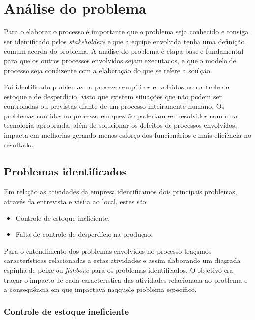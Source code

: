 \chapter{Análise do problema}

Para o elaborar o processo é importante que o problema seja conhecido e consiga ser identificado pelos {\itshape stakeholders} e que a equipe envolvida tenha uma definição comum acerda do problema. A análise do problema é etapa base e fundamental para que os outros processos envolvidos sejam executados, e que o modelo de processo seja condizente com a elaboração do que se refere a soulção.

Foi identificado problemas no processo empíricos envolvidos no controle do estoque e de desperdício, visto que existem situações que não podem ser controladas ou previstas diante de um processo inteiramente humano. Os problemas contidos no processo em questão poderiam ser resolvidos com uma tecnologia apropriada, além de solucionar os defeitos de processos envolvidos, impacta em melhorias gerando menos esforço dos funcionários e mais eficiência no resultado.

\section{Problemas identificados}

Em relação as atividades da empresa identificamos dois principais problemas, através da entrevista e visita ao local, estes são:

\begin{itemize}
	\item Controle de estoque ineficiente;
	\item Falta de controle de desperdício na produção.
\end{itemize}

Para o entendimento dos problemas envolvidos no processo traçamos características relacionadas a estas atividades e assim elaborando um diagrada espinha de peixe ou {\itshape fishbone} para os problemas identificados. O objetivo era traçar o impacto de cada característica das atividades relacionada ao problema e a consequência em que impactava naqquele problema específico.

\subsection{Controle de estoque ineficiente}


